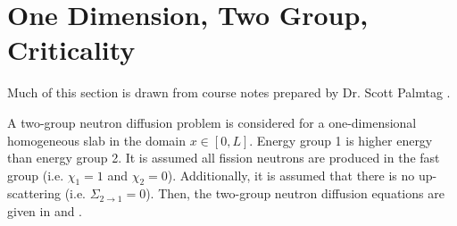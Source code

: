 \section{One Dimension, Two Group, Criticality}
  Much of this section is drawn from course notes prepared by Dr. Scott 
  Palmtag \cite{analytic2g}.
  
  A two-group neutron diffusion problem is considered for a one-dimensional
  homogeneous slab in the domain $x \in [0,L]$. Energy group 1 is higher energy
  than energy group 2. It is assumed all fission neutrons are  produced in the
  fast group (i.e. $\chi_1=1$ and $\chi_2=0$). Additionally, it is assumed that 
  there is no up-scattering  (i.e. $\Sigma_{2\rightarrow1}=0$).  Then, the
  two-group neutron diffusion equations are given in  and 
  .
  

